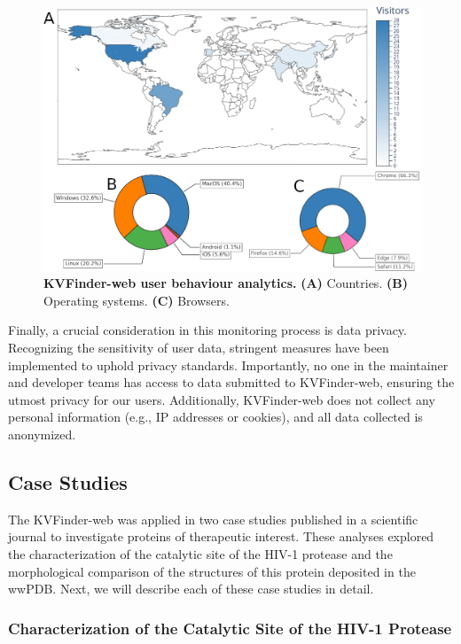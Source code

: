 \documentclass[Ingles]{phdthesis}
\def\eg{e.g.\onedot}
\begin{document}
\begin{figure}[h]
  \centering
  \includegraphics[scale=1.4]{images/clarity-monitoring.png}
  \caption[KVFinder-web user behaviour analytics]{\textbf{KVFinder-web user behaviour analytics.} \textbf{(A)} Countries. \textbf{(B)} Operating systems. \textbf{(C)} Browsers.}
  \label{fig:clarity-analytics}
\end{figure}

Finally, a crucial consideration in this monitoring process is data privacy. Recognizing the sensitivity of user data, stringent measures have been implemented to uphold privacy standards. Importantly, no one in the maintainer and developer teams has access to data submitted to KVFinder-web, ensuring the utmost privacy for our users. Additionally, KVFinder-web does not collect any personal information (\eg, IP addresses or cookies), and all data collected is anonymized.

\subsection{Case Studies}

The KVFinder-web was applied in two case studies published in a scientific journal to investigate proteins of therapeutic interest. These analyses explored the characterization of the catalytic site of the \acs{HIV-1} protease and the morphological comparison of the structures of this protein deposited in the \acs{wwPDB}. Next, we will describe each of these case studies in detail.

\subsubsection{Characterization of the Catalytic Site of the HIV-1 Protease \label{sec:kvweb-hiv1-protease}}
\end{document}
